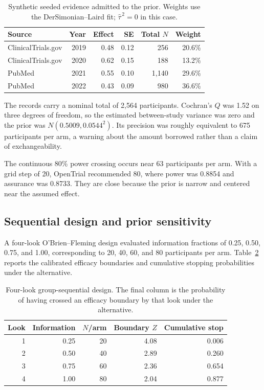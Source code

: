 \documentclass{article}
\begin{document}
\begin{table}[H]
\caption{Synthetic seeded evidence admitted to the prior. Weights use the DerSimonian--Laird fit; \(\widehat{\tau}^{\,2}=0\) in this case.}
\label{tab:evidence}
\centering
\small
\setlength{\tabcolsep}{5.2pt}
\begin{tabular}{lrrrrr}
\toprule
Source & Year & Effect & SE & Total \(N\) & Weight \\
\midrule
ClinicalTrials.gov & 2019 & 0.48 & 0.12 & 256  & 20.6\% \\
ClinicalTrials.gov & 2020 & 0.62 & 0.15 & 188  & 13.2\% \\
PubMed             & 2021 & 0.55 & 0.10 & 1,140 & 29.6\% \\
PubMed             & 2022 & 0.43 & 0.09 & 980  & 36.6\% \\
\bottomrule
\end{tabular}
\end{table}

The records carry a nominal total of 2,564 participants. Cochran's \(Q\) was 1.52 on three degrees of freedom, so the estimated between-study variance was zero and the prior was \(N(0.5009,0.0544^2)\). Its precision was roughly equivalent to 675 participants per arm, a warning about the amount borrowed rather than a claim of exchangeability.

The continuous 80\% power crossing occurs near 63 participants per arm. With a grid step of 20, OpenTrial recommended 80, where power was 0.8854 and assurance was 0.8733. They are close because the prior is narrow and centered near the assumed effect.

\subsection{Sequential design and prior sensitivity}

A four-look O'Brien--Fleming design evaluated information fractions of 0.25, 0.50, 0.75, and 1.00, corresponding to 20, 40, 60, and 80 participants per arm. Table~\ref{tab:sequential} reports the calibrated efficacy boundaries and cumulative stopping probabilities under the alternative.

\begin{table}[H]
\caption{Four-look group-sequential design. The final column is the probability of having crossed an efficacy boundary by that look under the alternative.}
\label{tab:sequential}
\centering
\small
\setlength{\tabcolsep}{8pt}
\begin{tabular}{rrrrr}
\toprule
Look & Information & \(N\)/arm & Boundary \(Z\) & Cumulative stop \\
\midrule
1 & 0.25 & 20 & 4.08 & 0.006 \\
2 & 0.50 & 40 & 2.89 & 0.260 \\
3 & 0.75 & 60 & 2.36 & 0.654 \\
4 & 1.00 & 80 & 2.04 & 0.877 \\
\bottomrule
\end{tabular}
\end{table}
\end{document}
